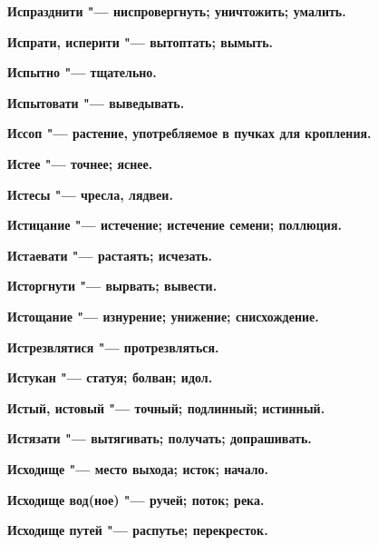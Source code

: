 \begin{multicols}{2}
\bfseries Испразднити\normalfont{} "--- ниспровергнуть; уничтожить; умалить. 




\bfseries Испрати, исперити\normalfont{} "--- вытоптать; вымыть. 




\bfseries Испытно\normalfont{} "--- тщательно. 




\bfseries Испытовати\normalfont{} "--- выведывать. 




\bfseries Иссоп\normalfont{} "--- растение, употребляемое в пучках для кропления. 




\bfseries Истее\normalfont{} "--- точнее; яснее. 




\bfseries Истесы\normalfont{} "--- чресла, лядвеи. 




\bfseries Истицание\normalfont{} "--- истечение; истечение семени; поллюция. 




\bfseries Истаевати\normalfont{} "--- растаять; исчезать. 




\bfseries Исторгнути\normalfont{} "--- вырвать; вывести. 




\bfseries Истощание\normalfont{} "--- изнурение; унижение; снисхождение. 




\bfseries Истрезвлятися\normalfont{} "--- протрезвляться. 




\bfseries Истукан\normalfont{} "--- статуя; болван; идол. 




\bfseries Истый, истовый\normalfont{} "--- точный; подлинный; истинный. 




\bfseries Истязати\normalfont{} "--- вытягивать; получать; допрашивать. 




\bfseries Исходище\normalfont{} "--- место выхода; исток; начало. 




\bfseries Исходище вод(ное)\normalfont{} "--- ручей; поток; река. 




\bfseries Исходище путей\normalfont{} "--- распутье; перекресток. 





\end{multicols}
